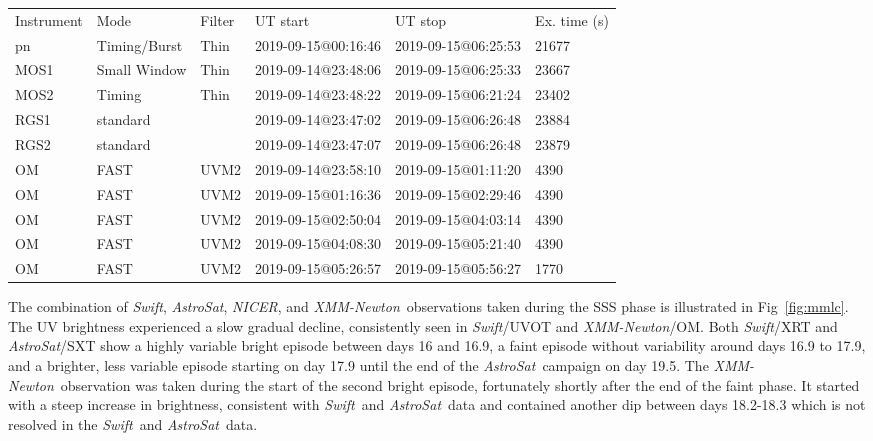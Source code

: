 \documentclass{aa}
\newcommand{\swift}{{\it Swift}}
\newcommand{\xmm}{{\it XMM-Newton}}
\newcommand{\asat}{{\it AstroSat}}
\newcommand{\nicer}{{\it NICER}}
\begin{document}
\begin{table*}
\begin{flushleft}
\renewcommand{\arraystretch}{1.1}
\caption{\label{tab:obs}Journal of exposures taken with the \xmm\ observation ID 0821560201}
\begin{tabular}{llllll}
\hline
Instrument & Mode & Filter & UT start & UT stop & Ex. time (s)\\
pn & Timing/Burst & Thin & 2019-09-15@00:16:46 &2019-09-15@06:25:53 & 21677\\
MOS1 & Small Window & Thin & 2019-09-14@23:48:06 &2019-09-15@06:25:33&23667\\
MOS2 & Timing & Thin & 2019-09-14@23:48:22 &2019-09-15@06:21:24 &23402\\
RGS1 & standard & & 2019-09-14@23:47:02 &2019-09-15@06:26:48&23884\\
RGS2 & standard & & 2019-09-14@23:47:07 &2019-09-15@06:26:48 &23879\\
OM &  FAST & UVM2 &2019-09-14@23:58:10  &  2019-09-15@01:11:20 & 4390\\
OM &  FAST & UVM2 &2019-09-15@01:16:36  &  2019-09-15@02:29:46 & 4390\\
OM &  FAST & UVM2 &2019-09-15@02:50:04  &  2019-09-15@04:03:14 & 4390\\
OM &  FAST & UVM2 &2019-09-15@04:08:30  &  2019-09-15@05:21:40 & 4390\\
OM &  FAST & UVM2 &2019-09-15@05:26:57  &  2019-09-15@05:56:27 & 1770\\
\hline
\end{tabular}
\renewcommand{\arraystretch}{1}
\end{flushleft}
\end{table*}

The combination of \swift, \asat, \nicer, and \xmm\ observations taken during
the SSS phase is illustrated in
Fig~\ref{fig:mmlc}. The UV brightness experienced a slow gradual
decline, consistently seen in \swift/UVOT and \xmm/OM. Both \swift/XRT
and \asat/SXT show a highly variable bright episode between days 16
and 16.9, a faint episode without variability around days 16.9 to
17.9, and a brighter, less variable episode starting on day 17.9
until the end of the \asat\ campaign on day 19.5.
The \xmm\ observation was taken during the start of the second bright
episode, fortunately shortly after the end of the faint phase. It started
with a steep increase in brightness, consistent with \swift\ 
and \asat\ data and contained another dip between days 18.2-18.3 which is
not resolved in the \swift\ and \asat\ data.\\
\end{document}
